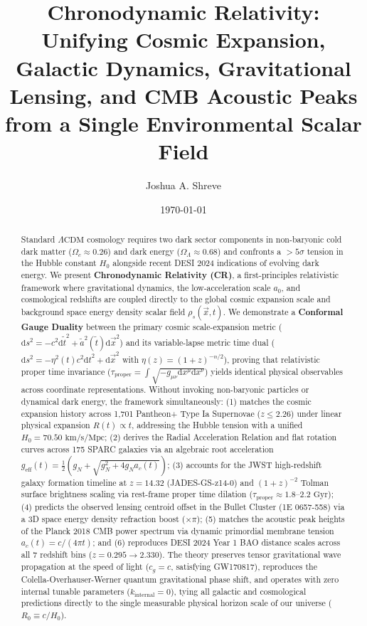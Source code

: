 \documentclass[aps,prd,reprint,superscriptaddress,nofootinbib,floatfix,amsmath,amssymb]{revtex4-2}
\begin{document}
\title{Chronodynamic Relativity: Unifying Cosmic Expansion, Galactic Dynamics, Gravitational Lensing, and CMB Acoustic Peaks from a Single Environmental Scalar Field}

\author{Joshua A. Shreve}

\date{\today}

\begin{abstract}
Standard $\Lambda\text{CDM}$ cosmology requires two dark sector components in non-baryonic cold dark matter ($\Omega_c \approx 0.26$) and dark energy ($\Omega_\Lambda \approx 0.68$) and confronts a $>5\sigma$ tension in the Hubble constant $H_0$ alongside recent DESI 2024 indications of evolving dark energy. We present \textbf{Chronodynamic Relativity (CR)}, a first-principles relativistic framework where gravitational dynamics, the low-acceleration scale $a_0$, and cosmological redshifts are coupled directly to the global cosmic expansion scale and background space energy density scalar field $\rho_s(\vec{x}, t)$. We demonstrate a \textbf{Conformal Gauge Duality} between the primary cosmic scale-expansion metric ($\mathrm{d}s^2 = -c^2 \mathrm{d}\tilde{t}^2 + \tilde{a}^2(\tilde{t})\mathrm{d}\vec{x}^2$) and its variable-lapse metric time dual ($\mathrm{d}s^2 = -\eta^2(t) c^2 \mathrm{d}t^2 + \mathrm{d}\vec{x}^2$ with $\eta(z) = (1+z)^{-n/2}$), proving that relativistic proper time invariance ($\tau_{\mathrm{proper}} = \int \sqrt{-g_{\mu\nu}\mathrm{d}x^\mu\mathrm{d}x^\nu}$) yields identical physical observables across coordinate representations. Without invoking non-baryonic particles or dynamical dark energy, the framework simultaneously: (1) matches the cosmic expansion history across 1,701 Pantheon+ Type Ia Supernovae ($z \le 2.26$) under linear physical expansion $R(t) \propto t$, addressing the Hubble tension with a unified $H_0 = 70.50\text{ km/s/Mpc}$; (2) derives the Radial Acceleration Relation and flat rotation curves across 175 SPARC galaxies via an algebraic root acceleration $g_{\text{eff}}(t) = \frac{1}{2}(g_N + \sqrt{g_N^2 + 4 g_N a_c(t)})$; (3) accounts for the JWST high-redshift galaxy formation timeline at $z = 14.32$ (JADES-GS-z14-0) and $(1+z)^{-2}$ Tolman surface brightness scaling via rest-frame proper time dilation ($\tau_{\mathrm{proper}} \approx 1.8\text{--}2.2\text{ Gyr}$); (4) predicts the observed lensing centroid offset in the Bullet Cluster (1E 0657-558) via a 3D space energy density refraction boost ($\times \pi$); (5) matches the acoustic peak heights of the Planck 2018 CMB power spectrum via dynamic primordial membrane tension $a_c(t) = c / (4\pi t)$; and (6) reproduces DESI 2024 Year 1 BAO distance scales across all 7 redshift bins ($z=0.295 \to 2.330$). The theory preserves tensor gravitational wave propagation at the speed of light ($c_g = c$, satisfying GW170817), reproduces the Colella-Overhauser-Werner quantum gravitational phase shift, and operates with zero internal tunable parameters ($k_{\text{internal}} = 0$), tying all galactic and cosmological predictions directly to the single measurable physical horizon scale of our universe ($R_0 \equiv c/H_0$).
\end{abstract}
\end{document}
